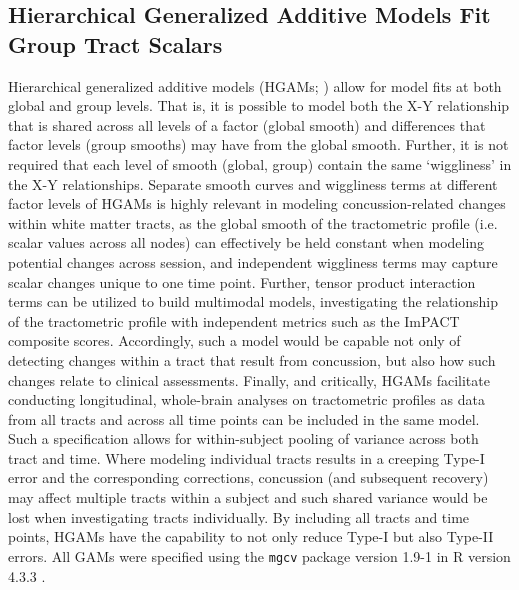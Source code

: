 \documentclass[12pt]{article}
\begin{document}
\subsection{Hierarchical Generalized Additive Models Fit Group Tract Scalars}
\label{ssec:meth-gam}
Hierarchical generalized additive models (HGAMs; \cite{pedersen2019HierarchicalGeneralizedAdditive}) allow for model fits at both global and group levels. That is, it is possible to model both the X-Y relationship that is shared across all levels of a factor (global smooth) and differences that factor levels (group smooths) may have from the global smooth. Further, it is not required that each level of smooth (global, group) contain the same `wiggliness' in the X-Y relationships. Separate smooth curves and wiggliness terms at different factor levels of HGAMs is highly relevant in modeling concussion-related changes within white matter tracts, as the global smooth of the tractometric profile (i.e. scalar values across all nodes) can effectively be held constant when modeling potential changes across session, and independent wiggliness terms may capture scalar changes unique to one time point. Further, tensor product interaction terms can be utilized to build multimodal models, investigating the relationship of the tractometric profile with independent metrics such as the ImPACT composite scores. Accordingly, such a model would be capable not only of detecting changes within a tract that result from concussion, but also how such changes relate to clinical assessments. Finally, and critically, HGAMs facilitate conducting longitudinal, whole-brain analyses on tractometric profiles as data from all tracts and across all time points can be included in the same model. Such a specification allows for within-subject pooling of variance across both tract and time. Where modeling individual tracts results in a creeping Type-I error and the corresponding corrections, concussion (and subsequent recovery) may affect multiple tracts within a subject and such shared variance would be lost when investigating tracts individually. By including all tracts and time points, HGAMs have the capability to not only reduce Type-I but also Type-II errors. All GAMs were specified using the \lstinline{mgcv} package version 1.9-1 \parencite{wood2017GeneralizedAdditiveModels} in R version 4.3.3 \parencite{rcoreteam2023LanguageEnvironmentStatistical}.

\end{document}
